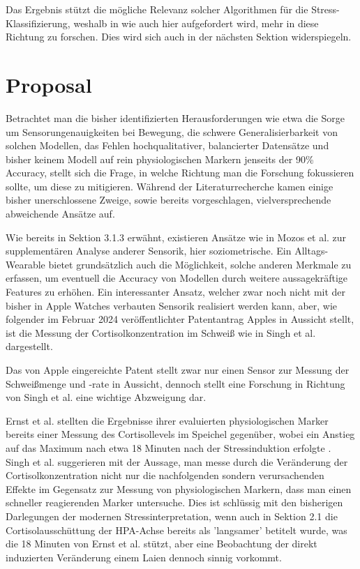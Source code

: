 Das Ergebnis stützt die mögliche Relevanz solcher Algorithmen für die Stress-Klassifizierung, weshalb in \cite{Iqbal2022} wie auch hier aufgefordert wird, mehr in diese Richtung zu forschen. Dies wird sich auch in der nächsten Sektion widerspiegeln.

\section{Proposal}
Betrachtet man die bisher identifizierten Herausforderungen wie etwa die Sorge um Sensorungenauigkeiten bei Bewegung, die schwere Generalisierbarkeit von solchen Modellen, das Fehlen hochqualitativer, balancierter Datensätze und bisher keinem Modell auf rein physiologischen Markern jenseits der 90\% Accuracy, stellt sich die Frage, in welche Richtung man die Forschung fokussieren sollte, um diese zu mitigieren. Während der Literaturrecherche kamen einige bisher unerschlossene Zweige, sowie bereits vorgeschlagen, vielversprechende abweichende Ansätze auf.

Wie bereits in Sektion 3.1.3 erwähnt, existieren Ansätze wie in Mozos et al. zur supplementären Analyse anderer Sensorik, hier soziometrische. Ein Alltags-Wearable bietet grundsätzlich auch die Möglichkeit, solche anderen Merkmale zu erfassen, um eventuell die Accuracy von Modellen durch weitere aussagekräftige Features zu erhöhen. Ein interessanter Ansatz, welcher zwar noch nicht mit der bisher in Apple Watches verbauten Sensorik realisiert werden kann, aber, wie folgender im Februar 2024 veröffentlichter Patentantrag Apples \cite{Kim2024} in Aussicht stellt, ist die Messung der Cortisolkonzentration im Schweiß wie in Singh et al. \cite{Singh2023} dargestellt.

Das von Apple eingereichte Patent stellt zwar nur einen Sensor zur Messung der Schweißmenge und -rate in Aussicht, dennoch stellt eine Forschung in Richtung von Singh et al. eine wichtige Abzweigung dar.

Ernst et al. stellten die Ergebnisse ihrer evaluierten physiologischen Marker bereits einer Messung des Cortisollevels im Speichel gegenüber, wobei ein Anstieg auf das Maximum nach etwa 18 Minuten nach der Stressinduktion erfolgte \cite{Ernst2023}. Singh et al. suggerieren mit der Aussage, man messe durch die Veränderung der Cortisolkonzentration nicht nur die nachfolgenden sondern verursachenden Effekte im Gegensatz zur Messung von physiologischen Markern, dass man einen schneller reagierenden Marker untersuche. Dies ist schlüssig mit den bisherigen Darlegungen der modernen Stressinterpretation, wenn auch in Sektion 2.1 die Cortisolausschüttung der \ac{HPA-Achse} bereits als 'langsamer' betitelt wurde, was die 18 Minuten von Ernst et al. stützt, aber eine Beobachtung der direkt induzierten Veränderung einem Laien dennoch sinnig vorkommt.

